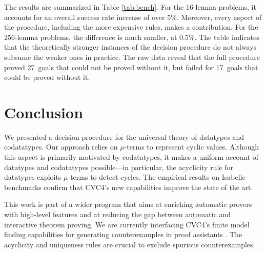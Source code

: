 \documentclass[letter]{article}
\theoremstyle{plain}
\theoremstyle{definition}
\begin{document}
The results are summarized in Table \ref{tab:bench}.
For the 16-lemma problems, it accounts for an overall
success rate increase of over 5\%.
Moreover, every aspect of the procedure, including the
more expensive rules, makes a contribution.
%
For the 256-lemma problems, the difference
is much smaller, at 0.5\%.
The table indicates that
the theoretically stronger instances of the decision
procedure do not always subsume the weaker ones in practice.
The raw data reveal that the full procedure proved 27~goals that
could not be proved without it, but failed for 17~goals that could be proved
without it.

\section{Conclusion}
\label{sec:conclusion}

We presented a decision procedure for the universal theory of datatypes and
codatatypes. Our approach relies on $\mu$-terms to represent cyclic values.
Although this aspect is primarily motivated by codatatypes, it makes
a uniform account of datatypes and codatatypes possible---in particular,
the acyclicity rule for datatypes exploits $\mu$-terms to detect cycles.
The empirical results on Isabelle benchmarks
confirm that CVC4's new capabilities improve the state of the art.

This work is part of a wider program that aims at enriching automatic provers
with high-level features and at reducing the gap between automatic and
interactive theorem proving.
We are currently interfacing CVC4's finite model finding capabilities
for generating counterexamples in proof assistants
\cite{reynolds-et-al-2016-smt}.
The acyclicity and uniqueness rules are
crucial to exclude spurious counterexamples.
\end{document}
